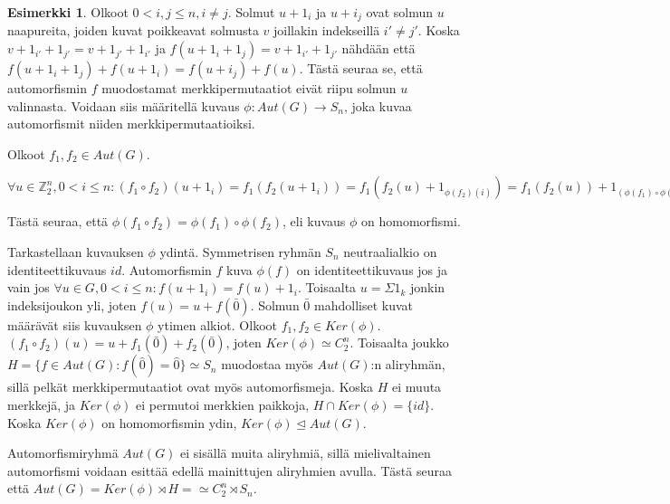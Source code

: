 \documentclass[a4paper, 12pt]{article}
\theoremstyle{definition}
\newtheorem{example}[mydef]{Esimerkki}
\theoremstyle{plain}
\begin{document}
\begin{example}
Olkoot $0 < i, j \leq n, i \neq j$. Solmut $u + 1_i$ ja $u+ i_j$ ovat solmun $u$ naapureita, joiden kuvat poikkeavat solmusta $v$ joillakin indekseillä $i' \neq j'$. Koska $v + 1_{i'} + 1_{j'} = v + 1_{j'} + 1_{i'}$ ja $f(u + 1_i + 1_j) = v + 1_{i'} + 1_{j'}$ nähdään että $f(u + 1_i + 1_j) + f(u + 1_i) = f(u + i_j) + f(u)$. Tästä seuraa se, että automorfismin $f$ muodostamat merkkipermutaatiot eivät riipu solmun $u$ valinnasta. Voidaan siis määritellä kuvaus ${\phi: Aut(G) \rightarrow S_n}$, joka kuvaa automorfismit niiden merkkipermutaatioiksi. 

Olkoot $f_1, f_2 \in Aut(G)$. 
\begin{center}
\begin{math}
\forall u \in \mathbb{Z}_2^n, 0 < i \leq n: (f_1 \circ f_2)(u + 1_i) = f_1(f_2(u + 1_i))
= f_1(f_2(u) + 1_{\phi(f_2)(i)}) = f_1(f_2(u)) + 1_{(\phi(f_1) \circ \phi(f_2))(i)}
\end{math}
\end{center}
Tästä seuraa, että $\phi(f_1 \circ f_2) = \phi(f_1) \circ \phi(f_2)$, eli kuvaus $\phi$ on homomorfismi.

Tarkastellaan kuvauksen $\phi$ ydintä. Symmetrisen ryhmän $S_n$ neutraalialkio on identiteettikuvaus $id$. Automorfismin $f$ kuva $\phi(f)$ on identiteettikuvaus jos ja vain jos $ \forall u \in G, 0 < i \leq n: f(u + 1_i) = f(u) + 1_i$. Toisaalta $u = \Sigma 1_k$ jonkin indeksijoukon yli, joten $f(u) = u + f(\bar{0})$. Solmun $\bar{0}$ mahdolliset kuvat määrävät siis kuvauksen $\phi$ ytimen alkiot. Olkoot $f_1, f_2 \in Ker(\phi)$. $(f_1 \circ f_2)(u) = u + f_1(\bar{0}) + f_2(\bar{0})$, joten $Ker(\phi) \simeq C_2^n$. Toisaalta joukko $H = \{f \in Aut(G) : f(\hat{0}) = \hat{0}\} \simeq S_n$ muodostaa myös $Aut(G)$:n aliryhmän, sillä pelkät merkkipermutaatiot ovat myös automorfismeja. Koska $H$ ei muuta merkkejä, ja $Ker(\phi)$ ei permutoi merkkien paikkoja, $H \cap Ker(\phi) = \{ id \}$. Koska $Ker(\phi)$ on homomorfismin ydin, $Ker(\phi) \trianglelefteq Aut(G)$.

Automorfismiryhmä $Aut(G)$ ei sisällä muita aliryhmiä, sillä mielivaltainen automorfismi voidaan esittää edellä mainittujen aliryhmien avulla. Tästä seuraa että $Aut(G) = Ker(\phi) \rtimes H = \simeq C_2^n \rtimes S_n$.
\end{example}
\end{document}
